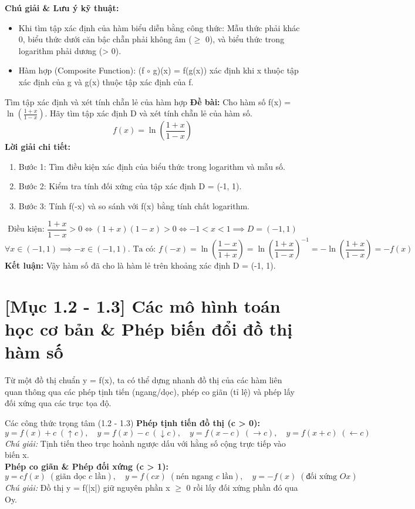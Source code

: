 \documentclass[11pt,a4paper,oneside]{book}
\begin{document}
\noindent\textbf{Chú giải \& Lưu ý kỹ thuật:}
\begin{itemize}[leftmargin=1.5em, itemsep=2pt]
  \item Khi tìm tập xác định của hàm biểu diễn bằng công thức: Mẫu thức phải khác 0, biểu thức dưới căn bậc chẵn phải không âm ($\ge$  0), và biểu thức trong logarithm phải dương (> 0).
  \item Hàm hợp (Composite Function): (f $\circ$  g)(x) = f(g(x)) xác định khi x thuộc tập xác định của g và g(x) thuộc tập xác định của f.
\end{itemize}

\begin{vidu}{Tìm tập xác định và xét tính chẵn lẻ của hàm hợp}
\textbf{Đề bài:} Cho hàm số f(x) = $\ln\left(\frac{1 + x}{1 - x}\right)$. Hãy tìm tập xác định D và xét tính chẵn lẻ của hàm số.
\[ f(x) = \ln\left(\frac{1 + x}{1 - x}\right) \]
\textbf{Lời giải chi tiết:}
\begin{enumerate}[leftmargin=1.5em, itemsep=2pt]
  \item Bước 1: Tìm điều kiện xác định của biểu thức trong logarithm và mẫu số.
  \item Bước 2: Kiểm tra tính đối xứng của tập xác định D = (-1, 1).
  \item Bước 3: Tính f(-x) và so sánh với f(x) bằng tính chất logarithm.
\end{enumerate}
\[ \text{Điều kiện: } \frac{1+x}{1-x} > 0 \iff (1+x)(1-x) > 0 \iff -1 < x < 1 \implies D = (-1, 1) \]
\[ \forall x \in (-1, 1) \implies -x \in (-1, 1). \text{ Ta có: } f(-x) = \ln\left(\frac{1-x}{1+x}\right) = \ln\left(\frac{1+x}{1-x}\right)^{-1} = -\ln\left(\frac{1+x}{1-x}\right) = -f(x) \]
\noindent\textbf{Kết luận:} Vậy hàm số đã cho là hàm lẻ trên khoảng xác định D = (-1, 1).
\end{vidu}

\section{[Mục 1.2 - 1.3] Các mô hình toán học cơ bản \& Phép biến đổi đồ thị hàm số}
Từ một đồ thị chuẩn y = f(x), ta có thể dựng nhanh đồ thị của các hàm liên quan thông qua các phép tịnh tiến (ngang/dọc), phép co giãn (tỉ lệ) và phép lấy đối xứng qua các trục tọa độ.

\begin{congthuc}{Các công thức trọng tâm (1.2 - 1.3)}
\noindent\textbf{Phép tịnh tiến đồ thị (c > 0):}
\[ y = f(x) + c \;(\uparrow c), \quad y = f(x) - c \;(\downarrow c), \quad y = f(x - c) \;(\rightarrow c), \quad y = f(x + c) \;(\leftarrow c) \]
\noindent\textit{Chú giải:} Tịnh tiến theo trục hoành ngược dấu với hằng số cộng trực tiếp vào biến x.\\[4pt]
\noindent\textbf{Phép co giãn \& Phép đối xứng (c > 1):}
\[ y = c f(x) \;(\text{giãn dọc } c \text{ lần}), \quad y = f(cx) \;(\text{nén ngang } c \text{ lần}), \quad y = -f(x) \;(\text{đối xứng } Ox) \]
\noindent\textit{Chú giải:} Đồ thị y = f(|x|) giữ nguyên phần x $\ge$  0 rồi lấy đối xứng phần đó qua Oy.\\[4pt]
\end{congthuc}
\end{document}
